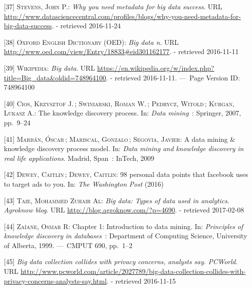 \documentclass[12pt,english,a4paper,titlepage,cleardoublepage=empty,dottedtoc]{report}
\begin{document}
\hypertarget{ref-web_2016_why-you-need-metadata-for-big-data-to-success}{}
{[}37{]} \textsc{Stevens, John P.}: \emph{Why you need metadata for big
data success}. URL
\url{http://www.datasciencecentral.com/profiles/blogs/why-you-need-metadata-for-big-data-success}.
- retrieved 2016-11-24

\hypertarget{ref-web_2016_oxford_definition_big-data}{}
{[}38{]} \textsc{Oxford English Dictionary (OED)}: \emph{Big data n.}
URL \url{http://www.oed.com/view/Entry/18833\#eid301162177}. - retrieved
2016-11-11

\hypertarget{ref-web_2016_wikipedia_definition_big-data}{}
{[}39{]} \textsc{Wikipedia}: \emph{Big data}. URL
\url{https://en.wikipedia.org/w/index.php?title=Big_data\&oldid=748964100}.
- retrieved 2016-11-11. ---~Page Version ID: 748964100

\hypertarget{ref-chapter_2007_the-knowledge-discovery-process}{}
{[}40{]} \textsc{Cios, Krzysztof J.}\,; \textsc{Swiniarski, Roman W.}\,;
\textsc{Pedrycz, Witold}\,; \textsc{Kurgan, Lukasz A.}: The knowledge
discovery process. In: \emph{Data mining}~: Springer, 2007, pp.~9--24

\hypertarget{ref-paper_2009_a-data-mining-knowledge-discovery-process-model}{}
{[}41{]} \textsc{Marbán, Óscar}\,; \textsc{Mariscal, Gonzalo}\,;
\textsc{Segovia, Javier}: A data mining \& knowledge discovery process
model. In: \emph{Data mining and knowledge discovery in real life
applications}. Madrid, Span~: InTech, 2009

\hypertarget{ref-web_2016_facebook-utilizes-98-data-points}{}
{[}42{]} \textsc{Dewey, Caitlin}\,; \textsc{Dewey, Caitlin}: 98 personal
data points that facebook uses to target ads to you. In: \emph{The
Washington Post} (2016)

\hypertarget{ref-web_2016_big-data-types-of-data-used-in-analytics}{}
{[}43{]} \textsc{Taie, Mohammed Zuhair Al}: \emph{Big data: Types of
data used in analytics. Agroknow blog}. URL
\url{http://blog.agroknow.com/?p=4690}. - retrieved 2017-02-08

\hypertarget{ref-book-chapter_1999_Principles-of-knowledge-discovery-in-databases_introduction-to-data-mining}{}
{[}44{]} \textsc{Zaïane, Osmar R}: Chapter 1: Introduction to data
mining. In: \emph{Principles of knowledge discovery in databases}~:
Department of Computing Science, University of Alberta, 1999. ---~CMPUT
690, pp.~1--2

\hypertarget{ref-web_2013_big-data-collection-collides-with-privacy-concerns}{}
{[}45{]} \emph{Big data collection collides with privacy concerns,
analysts say. PCWorld}. URL
\url{http://www.pcworld.com/article/2027789/big-data-collection-collides-with-privacy-concerns-analysts-say.html}.
- retrieved 2016-11-15
\end{document}
